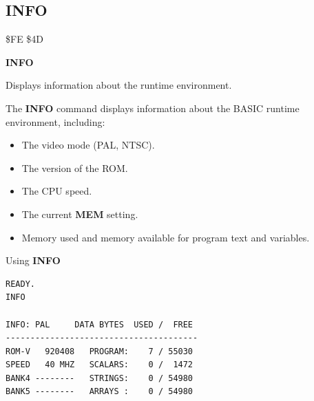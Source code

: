 
\newpage
\subsection{INFO}
\begin{description}[leftmargin=2cm,style=nextline]
\item [Token:]    \$FE \$4D

\item [Format:]   {\bf INFO}

\item [Usage:]    Displays information about the runtime environment.

\item [Remarks:]  The {\bf INFO} command displays information about the BASIC runtime environment, including:

                  \begin{itemize}
                     \item The video mode (PAL, NTSC).
                     \item The version of the ROM.
                     \item The CPU speed.
                     \item The current {\bf MEM} setting.
                     \item Memory used and memory available for program text and variables.
                  \end{itemize}

\item [Example:]  Using {\bf INFO}

\begin{tcolorbox}[colback=black,coltext=white]
\verbatimfont{\codefont}
\begin{verbatim}
READY.
INFO

INFO: PAL     DATA BYTES  USED /  FREE
---------------------------------------
ROM-V   920408   PROGRAM:    7 / 55030
SPEED   40 MHZ   SCALARS:    0 /  1472
BANK4 --------   STRINGS:    0 / 54980
BANK5 --------   ARRAYS :    0 / 54980
\end{verbatim}
\end{tcolorbox}
\end{description}


\newpage
